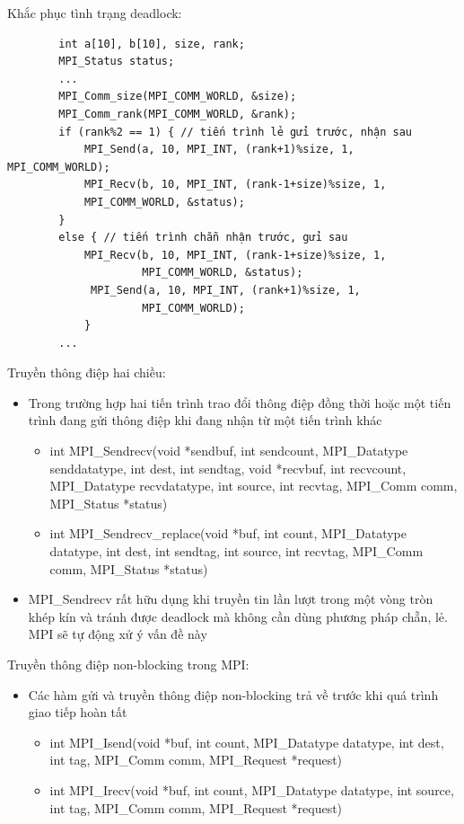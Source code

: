 \documentclass[14pt, a4paper]{article}
\numberwithin{equation}{section}
\numberwithin{figure}{section}
\numberwithin{dl}{section}
\numberwithin{md}{section}
\numberwithin{bd}{section}
\numberwithin{dn}{section}
\numberwithin{hq}{section}
\begin{document}
    Khắc phục tình trạng deadlock:

\begin{verbatim}
        int a[10], b[10], size, rank;
        MPI_Status status;
        ...
        MPI_Comm_size(MPI_COMM_WORLD, &size);
        MPI_Comm_rank(MPI_COMM_WORLD, &rank);
        if (rank%2 == 1) { // tiến trình lẻ gửi trước, nhận sau
            MPI_Send(a, 10, MPI_INT, (rank+1)%size, 1, MPI_COMM_WORLD);
            MPI_Recv(b, 10, MPI_INT, (rank-1+size)%size, 1,
            MPI_COMM_WORLD, &status);
        }
        else { // tiến trình chẵn nhận trước, gửi sau
            MPI_Recv(b, 10, MPI_INT, (rank-1+size)%size, 1,
                     MPI_COMM_WORLD, &status);
             MPI_Send(a, 10, MPI_INT, (rank+1)%size, 1,
                     MPI_COMM_WORLD);
            }
        ...     
\end{verbatim}

Truyền thông điệp hai chiều:

\begin{itemize}
    \item Trong trường hợp hai tiến trình trao đổi thông điệp đồng thời hoặc một tiến trình đang gửi thông điệp khi đang nhận từ một tiến trình khác
    \begin{itemize}
        \item int MPI\_Sendrecv(void *sendbuf, int sendcount,
                                MPI\_Datatype senddatatype, int dest, int sendtag,
                                void *recvbuf, int recvcount, MPI\_Datatype recvdatatype,
                                int source, int recvtag, MPI\_Comm comm,
                                MPI\_Status *status)
        \item int MPI\_Sendrecv\_replace(void *buf, int count,
                                         MPI\_Datatype datatype, int dest, int sendtag,
                                         int source, int recvtag, MPI\_Comm comm,
                                         MPI\_Status *status)
    \end{itemize}
    \item MPI\_Sendrecv rất hữu dụng khi truyền tin lần lượt trong một vòng tròn khép kín và tránh được deadlock mà không cần dùng phương pháp chẵn, lẻ.
    MPI sẽ tự động xử ý vấn đề này
\end{itemize}

Truyền thông điệp non-blocking trong MPI:

\begin{itemize}
    \item Các hàm gửi và truyền thông điệp non-blocking trả về trước khi quá trình giao tiếp hoàn tất 
    \begin{itemize}
        \item int MPI\_Isend(void *buf, int count, MPI\_Datatype datatype,
                            int dest, int tag, MPI\_Comm comm,
                            MPI\_Request *request) 
        \item int MPI\_Irecv(void *buf, int count, MPI\_Datatype datatype,
                               int source, int tag, MPI\_Comm comm,
                               MPI\_Request *request)
    \end{itemize}
\end{itemize}
\end{document}
